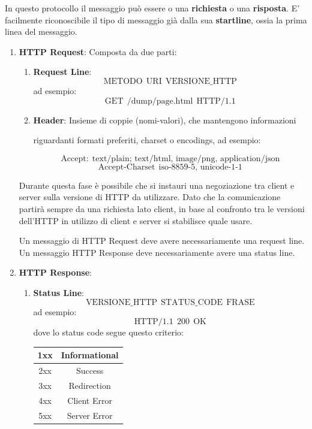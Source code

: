 \documentclass{article}
\begin{document}
In questo protocollo il messaggio può essere o una \textbf{richiesta} o una \textbf{risposta}.
E' facilmente riconoscibile il tipo di messaggio già dalla sua \textbf{startline}, ossia la prima linea del messaggio.

\begin{enumerate}
    \item \textbf{HTTP Request}: Composta da due parti:
    \begin{enumerate}
        \item \textbf{Request Line}:
        \[ \boxed{\text{METODO} \:\: \text{URI} \:\: \text{VERSIONE\_HTTP}} \]
        ad esempio:
        \[ \text{GET} \:\: \text{/dump/page.html} \:\: \text{HTTP/1.1} \]
        \item \textbf{Header}: Insieme di coppie (nomi-valori), che mantengono informazioni 
        
        riguardanti formati preferiti, charset o encodings, ad esempio:

        \[ \text{Accept:} \:\: \text{text/plain; text/html, image/png, application/json} \]
        \[ \text{Accept-Charset} \:\: \text{iso-8859-5, unicode-1-1} \]

    \end{enumerate}

    Durante questa fase è possibile che si instauri una negoziazione tra client e server sulla versione di HTTP da utilizzare. Dato che la comunicazione
    partirà sempre da una richiesta lato client, in base al confronto tra le versioni dell'HTTP in utilizzo di client e server si stabilisce quale usare.
    \vspace*{5px}

    Un messaggio di HTTP Request deve avere necessariamente una request line.
    \newline
    Un messaggio HTTP Response deve necessariamente avere una status line.

    \item \textbf{HTTP Response}:
    \begin{enumerate}
        \item \textbf{Status Line}:
        \[ \boxed{\text{VERSIONE\_HTTP} \:\: \text{STATUS\_CODE} \:\: \text{FRASE}} \]
        ad esempio:
        \[ \text{HTTP/1.1} \:\: \text{200} \:\: \text{OK} \]
        \vspace*{5px}
        dove lo status code segue questo criterio:
        \vspace*{5px}

        \begin{center}
        \begin{tabular}{ |c|c| } 
        \hline
        1xx & Informational \\ 
        \hline
        2xx & Success \\ 
        \hline
        3xx & Redirection \\ 
        \hline
        4xx & Client Error \\ 
        \hline
        5xx & Server Error \\ 
        \hline
        \end{tabular}
        \end{center}


\end{enumerate}
\end{enumerate}
\end{document}
